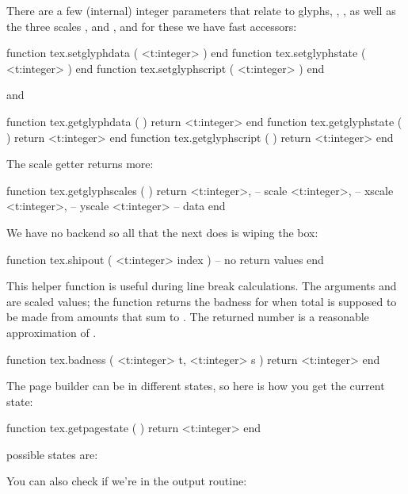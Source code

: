\startsubsection [title={Glyphs}]

There are a few (internal) integer parameters that relate to glyphs, \typ
{\glyphdatafield}, \typ {\glyphstatefield}, \typ {\glyphscriptfield} as well as
the three scales \typ {\glyphscale}, \typ {\glyphxscale} and \typ
{\glyphyscale}, and for these we have fast accessors:

\starttyping[option=LUA]
function tex.setglyphdata   ( <t:integer> ) end
function tex.setglyphstate  ( <t:integer> ) end
function tex.setglyphscript ( <t:integer> ) end
\stoptyping

and

\starttyping[option=LUA]
function tex.getglyphdata   ( ) return <t:integer> end
function tex.getglyphstate  ( ) return <t:integer> end
function tex.getglyphscript ( ) return <t:integer> end
\stoptyping

The scale getter returns more:

\starttyping[option=LUA]
function tex.getglyphscales ( )
    return
        <t:integer>, -- scale
        <t:integer>, -- xscale
        <t:integer>, -- yscale
        <t:integer>  -- data
end
\stoptyping

\stopsubsection

\startsubsection [title={Whatever}]

We have no backend so all that the next does is wiping the box:

\starttyping[option=LUA]
function tex.shipout ( <t:integer> index )
    -- no return values
end
\stoptyping

This helper function is useful during line break calculations. The arguments
 and  are scaled values; the function returns the badness for
when total  is supposed to be made from amounts that sum to .
The returned number is a reasonable approximation of .

\starttyping[option=LUA]
function tex.badness (
    <t:integer> t,
    <t:integer> s
)
    return <t:integer>
end
\stoptyping

The page builder can be in different states, so here is how you get the current state:

\starttyping[option=LUA]
function tex.getpagestate ( )
    return <t:integer>
end
\stoptyping

possible states are:

\starttworows
{}
\stoptworows

You can also check if we're in the output routine:

